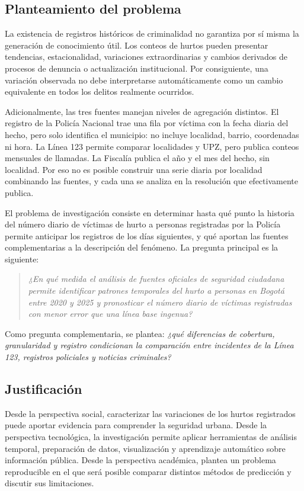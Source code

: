 \documentclass[12pt,letterpaper]{article}
\begin{document}
\subsection{Planteamiento del problema}

La existencia de registros históricos de criminalidad no garantiza por sí misma la generación de conocimiento útil. Los conteos de hurtos pueden presentar tendencias, estacionalidad, variaciones extraordinarias y cambios derivados de procesos de denuncia o actualización institucional. Por consiguiente, una variación observada no debe interpretarse automáticamente como un cambio equivalente en todos los delitos realmente ocurridos.

Adicionalmente, las tres fuentes manejan niveles de agregación distintos. El registro de la Policía Nacional trae una fila por víctima con la fecha diaria del hecho, pero solo identifica el municipio: no incluye localidad, barrio, coordenadas ni hora. La Línea 123 permite comparar localidades y UPZ, pero publica conteos mensuales de llamadas. La Fiscalía publica el año y el mes del hecho, sin localidad. Por eso no es posible construir una serie diaria por localidad combinando las fuentes, y cada una se analiza en la resolución que efectivamente publica.

El problema de investigación consiste en determinar hasta qué punto la historia del número diario de víctimas de hurto a personas registradas por la Policía permite anticipar los registros de los días siguientes, y qué aportan las fuentes complementarias a la descripción del fenómeno. La pregunta principal es la siguiente:

\begin{quote}
\emph{¿En qué medida el análisis de fuentes oficiales de seguridad ciudadana permite identificar patrones temporales del hurto a personas en Bogotá entre 2020 y 2025 y pronosticar el número diario de víctimas registradas con menor error que una línea base ingenua?}
\end{quote}

Como pregunta complementaria, se plantea: \emph{¿qué diferencias de cobertura, granularidad y registro condicionan la comparación entre incidentes de la Línea 123, registros policiales y noticias criminales?}

\subsection{Justificación}

Desde la perspectiva social, caracterizar las variaciones de los hurtos registrados puede aportar evidencia para comprender la seguridad urbana. Desde la perspectiva tecnológica, la investigación permite aplicar herramientas de análisis temporal, preparación de datos, visualización y aprendizaje automático sobre información pública. Desde la perspectiva académica, plantea un problema reproducible en el que será posible comparar distintos métodos de predicción y discutir sus limitaciones.
\end{document}

